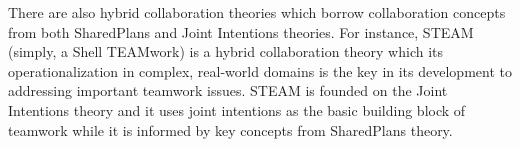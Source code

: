 \documentclass[a4paper, 11pt]{article}
\begin{document}
\begin{small}


There are also hybrid collaboration theories which borrow collaboration
concepts from both SharedPlans and Joint Intentions theories. For instance,
STEAM \cite{tambe:flexible-teamwork} (simply, a Shell TEAMwork) is a hybrid
collaboration theory which its operationalization in complex, real-world domains
is the key in its development to addressing important teamwork issues. STEAM is
founded on the Joint Intentions theory and it uses joint intentions as the basic
building block of teamwork while it is informed by key concepts from SharedPlans
theory.


\end{small}
\end{document}
